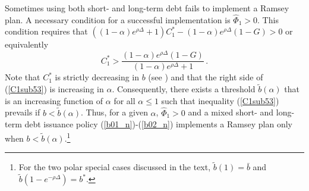 \documentclass[12pt]{article}
\begin{document}





Sometimes using  both short- and long-term debt fails to implement a Ramsey plan.  
A necessary condition for a successful implementation is 
  $\widehat{\Phi}_1 > 0$. This  condition requires that 
$((1 - \alpha)e^{\rho\Delta} + 1)C_1^* - (1 - \alpha)e^{\rho\Delta}(1 - G) > 0$ or equivalently 
\begin{equation} \label{C1sub531} 
	C_1^* > \frac{(1 - \alpha)e^{\rho\Delta}(1 - G)}{(1 - \alpha)e^{\rho\Delta} + 1} \,.
\end{equation}
Note that $C_1^*$ is strictly decreasing in $b$ (see \citeauthor{debortoli2021optimal}) and  that the right side of (\ref{C1sub53}) is increasing in $\alpha$. Consequently, there exists a  threshold $\tilde{b}(\alpha)$ that  is an increasing function of $\alpha$  for all $\alpha \leq 1$ such that 
inequality (\ref{C1sub53}) prevails if $b < \tilde{b}(\alpha)$. %
Thus, for a given $\alpha$, $\widehat{\Phi}_1 > 0$ and  a mixed short- and long-term debt issuance policy  (\ref{b01_n})-(\ref{b02_n}) implements a Ramsey plan only 
when $b < \tilde{b}(\alpha)$.\footnote{For the two polar special cases discussed in the text, $\tilde{b}(1)=\bar b$ and $\tilde{b}(1-e^{-\rho\Delta})=b^*$.}
\end{document}
